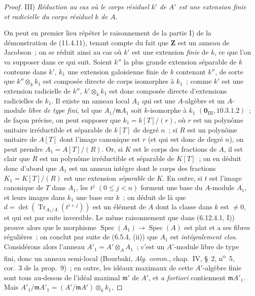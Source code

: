 \begin{proof}
\medskip
\noindent III) \emph{Réduction au cas où le corps résiduel $k'$ de
$A'$ est une extension finie et radicielle du corps résiduel $k$ de $A$.}

On peut en premier lieu répéter le raisonnement de la partie I) de la
démonstration de (11.4.11), tenant compte du fait que $\mathbf Z$ est un anneau
de
Jacobson~; on se réduit ainsi au cas où $k'$ est une extension \emph{finie} de
$k$, ce que l'on va supposer dans ce qui suit. Soient $k''$ la plus grande
extension séparable de $k$ contenue dans $k'$, $k_1$ une extension galoisienne
finie de $k$ contenant $k''$, de sorte que $k''\otimes_k k_1$ est composée
directe de corps isomorphes à $k_1$~; comme $k'$ est une extension radicielle de
$k''$, $k'\otimes_k k_1$ est donc composée directe d'extensions radicielles de
$k_1$. Il existe un anneau local $A_1$ qui est une $A$-algèbre et un $A$-module
\emph{libre de type fini}, tel que $A_1/\mathfrak m A_1$ soit $k$-isomorphe à
$k_1$ $(\mathbf 0_{\mathrm{III}},10.3.1.2)$~; de façon précise, on peut supposer
que $k_1=k[T]/(r)$, où $r$ est un polynôme unitaire irréductible et séparable de
$k[T]$ de degré $n$~; si $R$ est un polynôme unitaire de $A[T]$ dont l'image
canonique est $r$ (et qui est donc de degré $n$), on peut prendre
$A_1=A[T]/(R)$. Or, si $K$ est le corps des fractions de $A$, il est clair que
$R$ est un polynôme irréductible et séparable de $K[T]$~; on en déduit donc
d'abord que $A_1$ est un anneau intègre dont le corps des fractions
$K_1=K[T]/(R)$ est une extension \emph{séparable} de $K$. En outre, si $t$ est l'image
canonique de $T$ dans $A_1$, les $t^j$ $(0\leq j<n)$ forment une base du
$A$-module $A_1$, et leurs images dans $k_1$ une base sur $k$~; on déduit de là
que
$d=\det(\operatorname{Tr}_{A_1/A}(t^{i+j}))$
est un élément de $A$ dont la classe dans $k$ est $\ne0$, et qui est par suite
inversible. Le même raisonnement que dans (6.12.4.1, I)) prouve alors que le
morphisme $\operatorname{Spec}(A_1)\to\operatorname{Spec}(A)$ est plat et a ses
fibres régulières~; on conclut par suite de (6.5.4, (ii)) que $A_1$ est
\emph{intégralement clos}. Considérons alors l'anneau
$A'_1=A'\otimes_A A_1$~; c'est un $A'$-module libre de type fini, donc un anneau
semi-local (Bourbaki, \emph{Alg. comm.}, chap.~IV, \S~2, n\textsuperscript{o}~5, cor.~3 de
la prop.~9)~; en outre, les idéaux maximaux de cette $A'$-algèbre finie sont
tous au-dessus de l'idéal maximal $\mathfrak m'$ de $A'$, et \emph{a fortiori}
contiennent $\mathfrak m A'_1$. Mais
$A'_1/\mathfrak m A'_1=(A'/\mathfrak m A')\otimes_k k_1$,

\end{proof}
